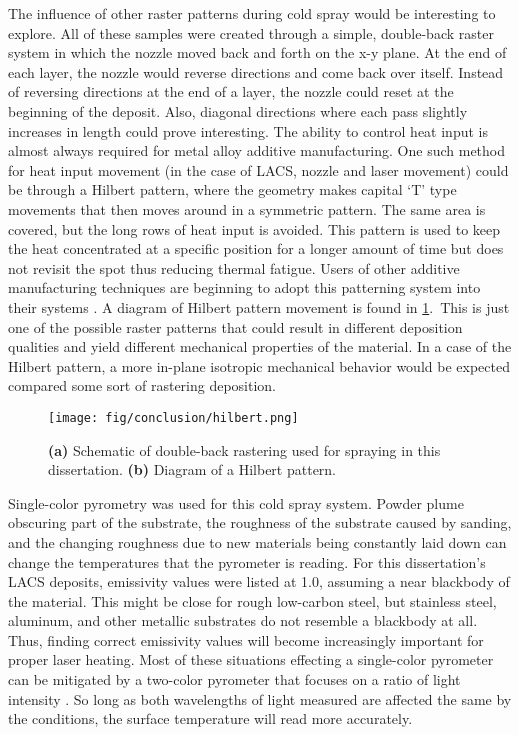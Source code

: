 	
		The influence of other raster patterns during cold spray would be interesting to explore. All of these samples were created through a simple, double-back raster system in which the nozzle moved back and forth on the x-y plane. At the end of each layer, the nozzle would reverse directions and come back over itself. Instead of reversing directions at the end of a layer, the nozzle could reset at the beginning of the deposit. Also, diagonal directions where each pass slightly increases in length could prove interesting. The ability to control heat input is almost always required for metal alloy additive manufacturing. One such method for heat input movement (in the case of LACS, nozzle and laser movement) could be through a Hilbert pattern, where the geometry makes capital ‘T’ type movements that then moves around in a symmetric pattern. The same area is covered, but the long rows of heat input is avoided. This pattern is used to keep the heat concentrated at a specific position for a longer amount of time but does not revisit the spot thus reducing thermal fatigue. Users of other additive manufacturing techniques are beginning to adopt this patterning system into their systems \cite{RN3439}. A diagram of Hilbert pattern movement is found in \ref{fig:hilbert}.\  This is just one of the possible raster patterns that could result in different deposition qualities and yield different mechanical properties of the material. In a case of the Hilbert pattern, a more in-plane isotropic mechanical behavior would be expected compared some sort of rastering deposition. 
		
		\begin{figure}
			\centering
			\texttt{[image: fig/conclusion/hilbert.png]}
			\caption{\textbf{(a)} Schematic of double-back rastering used for spraying in this dissertation. \textbf{(b)} Diagram of a Hilbert pattern.}
			\label{fig:hilbert}
		\end{figure}	
			
		Single-color pyrometry was used for this cold spray system. Powder plume obscuring part of the substrate, the roughness of the substrate caused by sanding, and the changing roughness due to new materials being constantly laid down can change the temperatures that the pyrometer is reading. For this dissertation’s LACS deposits, emissivity values were listed at 1.0, assuming a near blackbody of the material. This might be close for rough low-carbon steel, but stainless steel, aluminum, and other metallic substrates do not resemble a blackbody at all. Thus, finding correct emissivity values will become increasingly important for proper laser heating. Most of these situations effecting a single-color pyrometer can be mitigated by a two-color pyrometer that focuses on a ratio of light intensity \cite{RN3440}. So long as both wavelengths of light measured are affected the same by the conditions, the surface temperature will read more accurately.
			
